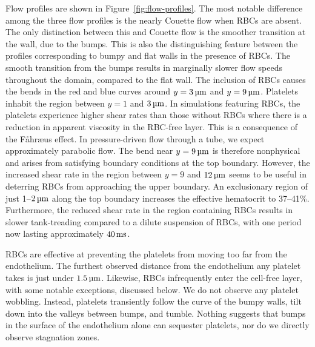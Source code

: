 Flow profiles are shown in Figure~\ref{fig:flow-profiles}. The most notable difference
among the three flow profiles is the nearly Couette flow when RBCs are absent. The only
distinction between this and Couette flow is the smoother transition at the wall, due to
the bumps. This is also the distinguishing feature between the profiles corresponding to
bumpy and flat walls in the presence of RBCs. The smooth transition from the bumps
results in marginally slower flow speeds throughout the domain, compared to the flat
wall. The inclusion of RBCs causes the bends in the red and blue curves around $y = 3\um$
and $y = 9\um$. Platelets inhabit the region between $y=1$ and $3\um$. In simulations
featuring RBCs, the platelets experience higher shear rates than those without RBCs where
there is a reduction in apparent viscosity in the RBC-free layer. This is a consequence
of the F\r{a}hr{\ae}us effect. In pressure-driven flow through a tube, we expect
approximately parabolic flow.  The bend near $y = 9\um$ is therefore nonphysical and
arises from satisfying boundary conditions at the top boundary. However, the increased
shear rate in the region between $y=9$ and $12\um$ seems to be useful in deterring RBCs
from approaching the upper boundary. An exclusionary region of just 1--$2\um$ along the
top boundary increases the effective hematocrit to 37--41\%. Furthermore, the reduced
shear rate in the region containing RBCs results in slower tank-treading compared to a
dilute suspension of RBCs, with one period now lasting approximately $40\ms$.

RBCs are effective at preventing the platelets from moving too far from the endothelium.
The furthest observed distance from the endothelium any platelet takes is just under
$1.5\um$. Likewise, RBCs infrequently enter the cell-free layer, with some notable
exceptions, discussed below. We do not observe any platelet wobbling. Instead, platelets
transiently follow the curve of the bumpy walls, tilt down into the valleys between
bumps, and tumble. Nothing suggests that bumps in the surface of the endothelium alone
can sequester platelets, nor do we directly observe stagnation zones.

